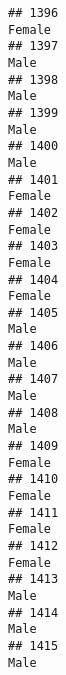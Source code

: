 \documentclass[]{article}
\begin{document}
\begin{verbatim}
## 1396                                                                                                                          Female
## 1397                                                                                                                            Male
## 1398                                                                                                                            Male
## 1399                                                                                                                            Male
## 1400                                                                                                                            Male
## 1401                                                                                                                          Female
## 1402                                                                                                                          Female
## 1403                                                                                                                          Female
## 1404                                                                                                                          Female
## 1405                                                                                                                            Male
## 1406                                                                                                                            Male
## 1407                                                                                                                            Male
## 1408                                                                                                                            Male
## 1409                                                                                                                          Female
## 1410                                                                                                                          Female
## 1411                                                                                                                          Female
## 1412                                                                                                                          Female
## 1413                                                                                                                            Male
## 1414                                                                                                                            Male
## 1415                                                                                                                            Male

\end{verbatim}
\end{document}
